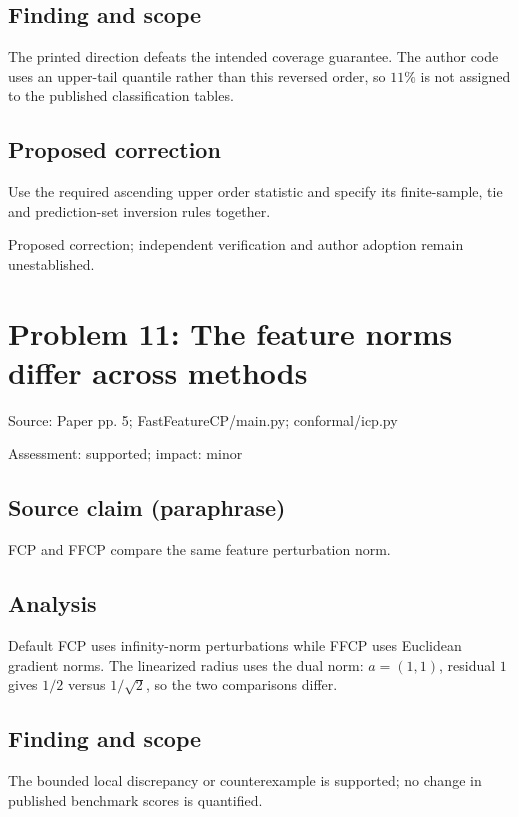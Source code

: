 \documentclass[11pt]{article}
\begin{document}
\subsection*{Finding and scope}

The printed direction defeats the intended coverage guarantee. The author code uses an upper-tail quantile rather than this reversed order, so \(11\%\) is not assigned to the published classification tables.

\subsection*{Proposed correction}

Use the required ascending upper order statistic and specify its finite-sample, tie and prediction-set inversion rules together.

Proposed correction; independent verification and author adoption remain unestablished.

\section*{Problem 11: The feature norms differ across methods}

Source: Paper pp. 5; FastFeatureCP/main.py; conformal/icp.py

Assessment: supported; impact: minor

\subsection*{Source claim (paraphrase)}

FCP and FFCP compare the same feature perturbation norm.

\subsection*{Analysis}

Default FCP uses infinity-norm perturbations while FFCP uses Euclidean gradient norms. The linearized radius uses the dual norm: \(a=(1,1)\), residual \(1\) gives \(1/2\) versus \(1/\sqrt2\), so the two comparisons differ.

\subsection*{Finding and scope}

The bounded local discrepancy or counterexample is supported; no change in published benchmark scores is quantified.
\end{document}
